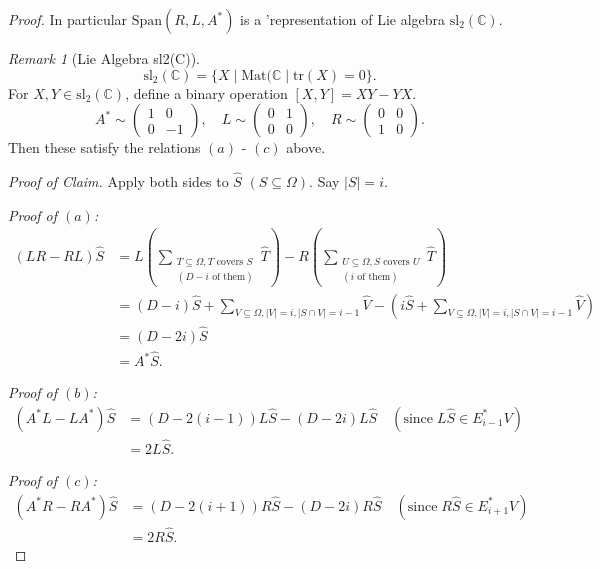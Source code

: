 \documentclass[
]{book}
\theoremstyle{definition}
\theoremstyle{definition}
\theoremstyle{definition}
\theoremstyle{definition}
\theoremstyle{remark}
\newtheorem*{remark}{Remark}
\begin{document}
\begin{proof}
In particular \(\mathrm{Span}(R,L, A^*)\) is a 'representation of Lie algebra \(\mathrm{sl}_2(\mathbb{C})\).

\begin{remark}[Lie Algebra sl2(C)]
\[\mathrm{sl}_2(\mathbb{C}) = \{X\mid \mathrm{Mat}(\mathbb{C} \mid \mathrm{tr}(X) = 0\}.\]
For \(X, Y\in \mathrm{sl}_2(\mathbb{C})\), define a binary operation \([X, Y] = XY - YX\).
\[A^*\sim \begin{pmatrix} 1 & 0 \\ 0 & -1\end{pmatrix}, \quad L\sim \begin{pmatrix} 0 & 1 \\ 0 & 0\end{pmatrix}, \quad R\sim \begin{pmatrix} 0 & 0 \\ 1 & 0\end{pmatrix}.\]
Then these satisfy the relations \((a)\) - \((c)\) above.
\end{remark}

\emph{Proof of Claim.}
Apply both sides to \(\hat{S}\) \quad \((S\subseteq \Omega)\). Say \(|S| = i\).

\emph{Proof of \((a)\):}
\begin{align} 
(LR - RL)\hat{S} & = L\left(\sum_{\substack{T \subseteq \Omega, T \text{ covers }S\\(D-i \text{ of them})}}\hat{T}\right) - R \left(\sum_{\substack{U \subseteq \Omega, S \text{ covers }U\\(i \text{ of them})}}\hat{T}\right)\\
& = (D-i)\hat{S} + \sum_{V \subseteq \Omega, |V| = i, |S\cap V| = i-1}\hat{V} - \left(i\hat{S} + \sum_{V \subseteq \Omega, |V| = i, |S\cap V| = i-1}\hat{V}\right)\\
& = (D-2i)\hat{S}\\
& = A^*\hat{S}.
\end{align}

\emph{Proof of \((b)\):}
\begin{align} 
(A^*L - LA^*)\hat{S} & = (D-2(i-1))L\hat{S} - (D-2i)L\hat{S} \quad (\text{since} \; L\hat{S}\in E^*_{i-1}V)\\
& = 2L\hat{S}.
\end{align}

\emph{Proof of \((c)\):}
\begin{align} 
(A^*R - RA^*)\hat{S} & = (D-2(i+1))R\hat{S} - (D-2i)R\hat{S} \quad (\text{since} \; R\hat{S}\in E^*_{i+1}V)\\
& = 2R\hat{S}.
\end{align}


\end{proof}
\end{document}
